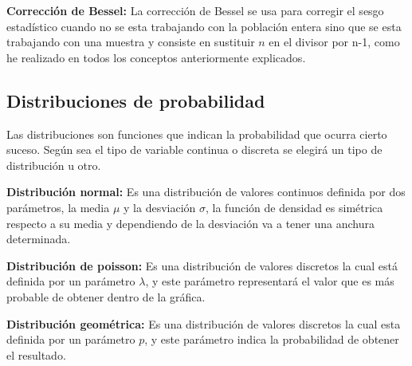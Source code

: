 \textbf{Corrección de Bessel:} La corrección de Bessel se usa para corregir el sesgo estadístico cuando no se esta trabajando con la población entera sino que se esta trabajando con una muestra y consiste en sustituir $n$ en el divisor por n-1, como he realizado en todos los conceptos anteriormente explicados\cite{bessel}.


\subsection{Distribuciones de probabilidad}

Las distribuciones son funciones que indican la probabilidad que ocurra cierto suceso. Según sea el tipo de variable continua o discreta se elegirá un tipo de distribución u otro.

\textbf{Distribución normal:} Es una distribución de valores continuos definida por dos parámetros, la media $\mu$ y la desviación $\sigma$, la función de densidad es simétrica respecto a su media y dependiendo de la desviación va a tener una anchura determinada\cite{distribuciones}.


\textbf{Distribución de poisson:} Es una distribución de valores discretos la cual está definida por un parámetro $\lambda$, y este parámetro representará el valor que es más probable de obtener dentro de la gráfica.


\textbf{Distribución geométrica:} Es una distribución de valores discretos la cual esta definida por un parámetro $p$, y este parámetro indica la probabilidad de obtener el resultado.

